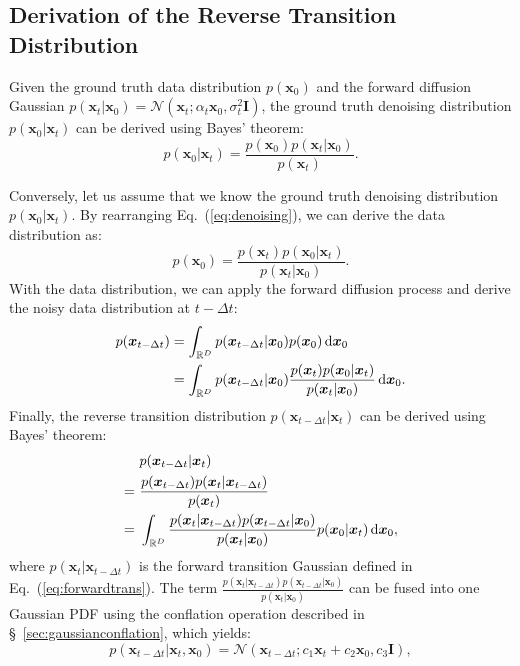 \documentclass{article}
\def\vx{{\bm{x}}}
\def\mI{{\bm{I}}}
\newcommand{\R}{\mathbb{R}}
\theoremstyle{custom}
\theoremstyle{definition}
\theoremstyle{remark}
\newcommand{\diff}{\mathop{}\!\mathrm{d}}
\begin{document}
\subsection{Derivation of the Reverse Transition Distribution}
\label{sec:trans_derive}

Given the ground truth data distribution $p(\vx_0)$ and the forward diffusion Gaussian $p(\vx_t|\vx_0) = \mathcal{N} (\vx_t; \alpha_t \vx_0, \sigma_t^2\mI)$, the ground truth denoising distribution $p(\vx_0 | \vx_t)$ can be derived using Bayes' theorem:
\begin{equation}
    p(\vx_0|\vx_t) = \frac{p(\vx_0) p(\vx_t | \vx_0)}{p(\vx_t)}.
    \label{eq:denoising}
\end{equation}

Conversely, let us assume that we know the ground truth denoising distribution $p(\vx_0|\vx_t)$. By rearranging Eq.~(\ref{eq:denoising}), we can derive the data distribution as:
\begin{equation}
    p(\vx_0) = \frac{p(\vx_t)p(\vx_0|\vx_t)}{p(\vx_t|\vx_0)}.
    \label{eq:data_distr}
\end{equation}
With the data distribution, we can apply the forward diffusion process and derive the noisy data distribution at $t - \Delta t$:
\begin{align}
    p(\vx_{t - \Delta t}) &= \int_{\R^D} p(\vx_{t - \Delta t}|\vx_0) p(\vx_0) \diff \vx_0 \notag\\
    &= \int_{\R^D} p(\vx_{t - \Delta t}|\vx_0) \frac{p(\vx_t)p(\vx_0|\vx_t)}{p(\vx_t|\vx_0)} \diff \vx_0.
\end{align}
Finally, the reverse transition distribution $p(\vx_{t - \Delta t}|\vx_t)$ can be derived using Bayes' theorem:
\begin{align}
    &\ p(\vx_{t - \Delta t}|\vx_t) \notag\\
    =&\ \frac{p(\vx_{t-\Delta t}) p(\vx_t|\vx_{t - \Delta t})}{p(\vx_t)} \notag\\
    =&\ \int_{\R^D} \frac{p(\vx_t | \vx_{t - \Delta t}) p(\vx_{t - \Delta t}|\vx_0)}{p(\vx_t|\vx_0)} p(\vx_0|\vx_t) \diff \vx_0,
    \label{eq:transbayes}
\end{align}
where $p(\vx_t|\vx_{t - \Delta t})$ is the forward transition Gaussian defined in Eq.~(\ref{eq:forwardtrans}). The term $\frac{p(\vx_t | \vx_{t - \Delta t}) p(\vx_{t - \Delta t}|\vx_0)}{p(\vx_t|\vx_0)}$ can be fused into one Gaussian PDF using the conflation operation described in \S~\ref{sec:gaussianconflation}, which yields:
\begin{equation}
    p(\vx_{t - \Delta t}|\vx_t, \vx_0) = \mathcal{N}(\vx_{t - \Delta t};c_1 \vx_t + c_2 \vx_0,c_3\mI),
\end{equation}
\end{document}
